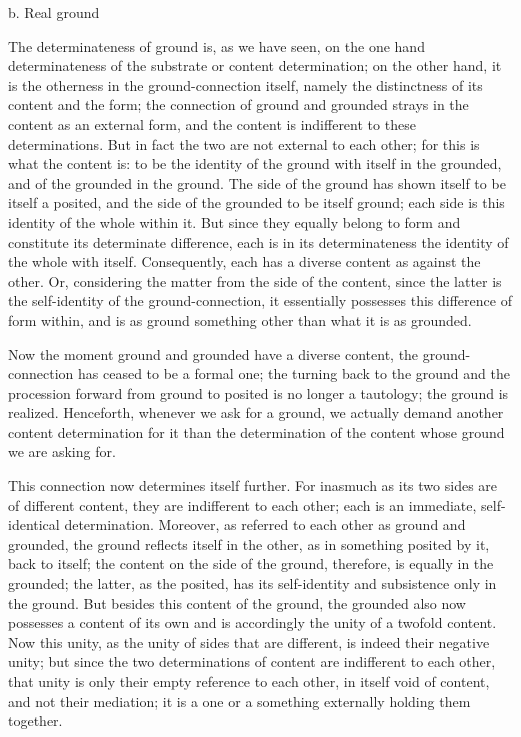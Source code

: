 b. Real ground

The determinateness of ground is, as we have seen,
on the one hand determinateness of the substrate
or content determination;
on the other hand,
it is the otherness in the ground-connection itself,
namely the distinctness of its content and the form;
the connection of ground and grounded strays
in the content as an external form,
and the content is indifferent to these determinations.
But in fact the two are not external to each other;
for this is what the content is:
to be the identity of the ground
with itself in the grounded,
and of the grounded in the ground.
The side of the ground
has shown itself to be itself a posited,
and the side of the grounded to be
itself ground;
each side is this identity of the whole within it.
But since they equally belong to form
and constitute its determinate difference,
each is in its determinateness the identity of the whole with itself.
Consequently, each has a diverse content as against the other.
Or, considering the matter from the side of the content,
since the latter is the self-identity of the ground-connection,
it essentially possesses this difference of form within,
and is as ground something other than what it is as grounded.

Now the moment ground and grounded have a diverse content,
the ground-connection has ceased to be a formal one;
the turning back to the ground and
the procession forward from ground to posited
is no longer a tautology; the ground is realized.
Henceforth, whenever we ask for a ground,
we actually demand another content determination for it
than the determination of the content whose ground we are asking for.

This connection now determines itself further.
For inasmuch as its two
sides are of different content, they are indifferent to each other; each is
an immediate, self-identical determination.
 Moreover, as referred to each
other as ground and grounded, the ground reflects itself in the other, as
in something posited by it, back to itself;
 the content on the side of the
ground, therefore, is equally in the grounded; the latter, as the posited, has
its self-identity and subsistence only in the ground.
 But besides this content
of the ground, the grounded also now possesses a content of its own and
is accordingly the unity of a twofold content.
Now this unity, as the unity
of sides that are different, is indeed their negative unity;
 but since the two
determinations of content are indifferent to each other,
that unity is only
their empty reference to each other,
in itself void of content, and not their
mediation;
it is a one or a something externally holding them together.

